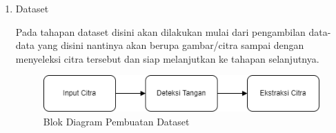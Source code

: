 \begin{enumerate}
  \item Dataset \par
  Pada tahapan dataset disini akan dilakukan mulai dari pengambilan data-data yang disini nantinya akan berupa gambar/citra sampai dengan menyeleksi citra tersebut dan siap melanjutkan ke tahapan selanjutnya.

\begin{figure}[!h]
	\centering
	\includegraphics[width=0.7\linewidth]{gambar/Dataset.png}
	\caption{Blok Diagram Pembuatan Dataset}
	\label{fig:gambar32}
\end{figure}


\end{enumerate}
